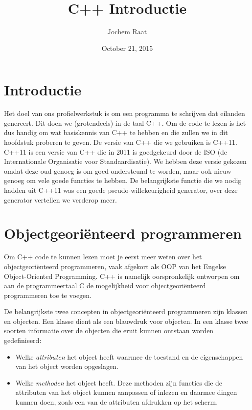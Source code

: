 \documentclass{article}
\title{C++ Introductie}
\author{Jochem Raat}
\date{October 21, 2015}
\begin{document}
\maketitle
\newpage

\tableofcontents
\newpage

\section{Introductie}
Het doel van ons profielwerkstuk is om een programma te schrijven dat eilanden genereert. Dit
doen we (grotendeels) in de taal C++. Om de code te lezen is het dus handig om wat basiskennis
van C++ te hebben en die zullen we in dit hoofdstuk proberen te geven.
De versie van C++ die we gebruiken is C++11. C++11 is een versie van C++ die in 2011 is
goedgekeurd door de ISO (de Internationale Organisatie voor Standaardisatie). We hebben deze
versie gekozen omdat deze oud genoeg is om goed ondersteund te worden, maar ook nieuw genoeg
om vele goede functies te hebben. De belangrijkste functie die we nodig hadden uit C++11 was een
goede pseudo-willekeurigheid generator, over deze generator vertellen we verderop meer.

\section{Objectgeoriënteerd programmeren}
Om C++ code te kunnen lezen moet je eerst meer weten over het objectgeoriënteerd programmeren,
vaak afgekort als OOP van het Engelse Object-Oriented Programming. C++ is namelijk
oorspronkelijk ontworpen om aan de programmeertaal C de mogelijkheid voor objectgeoriënteerd
programmeren toe te voegen.

De belangrijkste twee concepten in objectgeoriënteerd programmeren zijn klassen en objecten. Een
klasse dient als een blauwdruk voor objecten. In een klasse twee soorten informatie over de
objecten die eruit kunnen ontstaan worden gedefinieerd:

\begin{itemize}
  \item Welke \textit{attributen} het object heeft waarmee de toestand en de eigenschappen van het object worden opgeslagen.
  \item Welke \textit{methoden} het object heeft. Deze methoden zijn functies die de attributen van het object kunnen aanpassen of inlezen en daarmee dingen kunnen doen, zoals een van de attributen afdrukken op het scherm.
\end{itemize}
\end{document}
